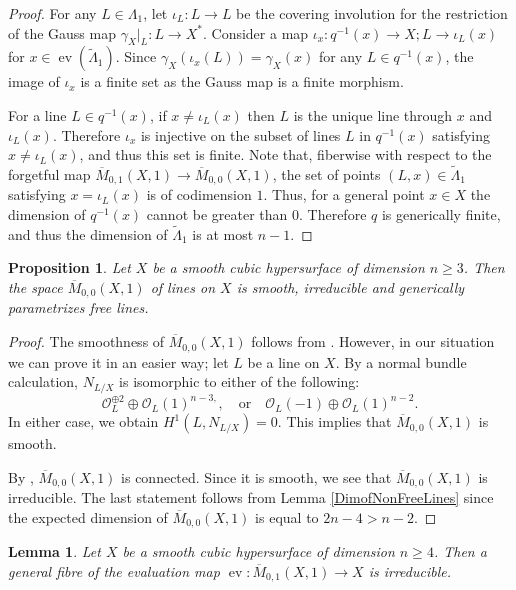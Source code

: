 \documentclass[dvipdfmx, 12pt, a4paper]{amsart}
\theoremstyle{plain}
\newtheorem{prop}[thm]{Proposition}
\newtheorem{lem}[thm]{Lemma}
\theoremstyle{definition}
\theoremstyle{remark}
\newcommand{\ra}{\rightarrow}
\newcommand{\cO}{\mathcal{O}}
\DeclareMathOperator{\ev}{ev}
\newcommand{\ol}{\overline}
\begin{document}
\begin{proof}
			For any $L\in\Lambda_1$, let $\iota_L:L\ra L$ be the covering involution for the restriction of the Gauss map $\gamma_X|_L:L\ra X^*$. Consider a map $\iota_x:q^{-1}(x)\ra X;L\ra\iota_L(x)$ for $x\in\ev(\widetilde{\Lambda}_1)$. Since $\gamma_X(\iota_x(L))=\gamma_X(x)$ for any $L\in q^{-1}(x)$, the image of $\iota_x$ is a finite set as the Gauss map is a finite morphism.
			
			For a line $L\in q^{-1}(x)$, if $x\neq\iota_L(x)$ then $L$ is the unique line through $x$ and $\iota_L(x)$. Therefore $\iota_x$ is injective on the subset of lines $L$ in $q^{-1}(x)$ satisfying $x\neq\iota_L(x)$, and thus this set is finite. Note that, fiberwise with respect to the forgetful map $\ol{M}_{0,1}(X,1)\ra\ol{M}_{0,0}(X,1)$, the set of points $(L,x)\in\widetilde{\Lambda}_1$ satisfying $x=\iota_L(x)$ is of codimension $1$. Thus, for a general point $x\in X$ the dimension of $q^{-1}(x)$ cannot be greater than $0$. Therefore $q$ is generically finite, and thus the dimension of $\widetilde{\Lambda}_1$ is at most $n-1$.
		\end{proof}


	\begin{prop}\label{LinesOnCubic}
		Let $X$ be a smooth cubic hypersurface of dimension $n\geq3$. Then the space $\ol{M}_{0,0}(X,1)$ of lines on $X$ is smooth, irreducible and generically parametrizes free lines.
	\end{prop}

		\begin{proof}
			The smoothness of $\ol{M}_{0,0}(X,1)$ follows from \cite[Corollary 1.12]{AltmanKleiman77}. However, in our situation we can prove it in an easier way; let $L$ be a line on $X$. By a normal bundle calculation, $N_{L/X}$ is isomorphic to either of the following:
			$$\cO_L^{\oplus2}\oplus\cO_L(1)^{n-3,},\quad\text{or}\quad\cO_L(-1)\oplus\cO_L(1)^{n-2}.$$
			In either case, we obtain $H^1(L,N_{L/X})=0$. This implies that $\ol{M}_{0,0}(X,1)$ is smooth.
			
			By \cite[Theorem 1.16 (i)]{AltmanKleiman77}, $\ol{M}_{0,0}(X,1)$ is connected. Since it is smooth, we see that $\ol{M}_{0,0}(X,1)$ is irreducible.
			The last statement follows from Lemma \ref{DimofNonFreeLines} since the expected dimension of $\ol{M}_{0,0}(X,1)$ is equal to $2n-4>n-2$.
		\end{proof}
	
	
	\begin{lem}\label{IrredFibres}
		Let $X$ be a smooth cubic hypersurface of dimension $n\geq4$. Then a general fibre of the evaluation map $\ev:\ol{M}_{0,1}(X,1)\ra X$ is irreducible.
	\end{lem}
\end{document}
